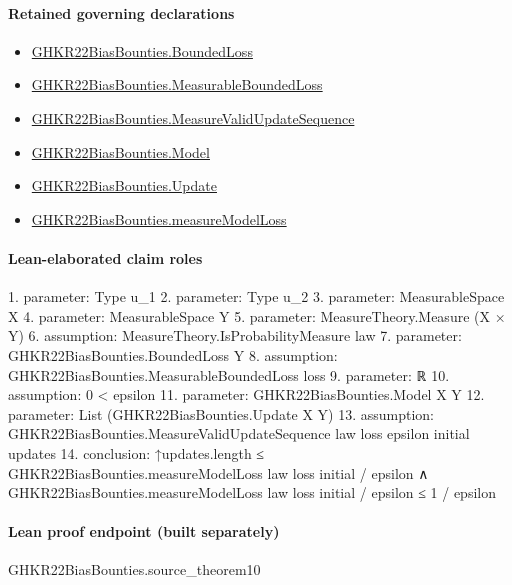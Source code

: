 \documentclass[10pt]{article}
\begin{document}
\paragraph{Retained governing declarations}
\begin{itemize}\raggedright
\item \hyperlink{paper-prerequisite-ef6c319b0770dad4}{GHKR22\allowbreak{}Bias\allowbreak{}Bounties.\allowbreak{}Bounded\allowbreak{}Loss}
\item \hyperlink{governing-declaration-56b96e1cde76e3f7}{GHKR22\allowbreak{}Bias\allowbreak{}Bounties.\allowbreak{}Measurable\allowbreak{}Bounded\allowbreak{}Loss}
\item \hyperlink{governing-declaration-894a171ecf6ab5b2}{GHKR22\allowbreak{}Bias\allowbreak{}Bounties.\allowbreak{}Measure\allowbreak{}Valid\allowbreak{}Update\allowbreak{}Sequence}
\item \hyperlink{paper-prerequisite-333127605c12eba8}{GHKR22\allowbreak{}Bias\allowbreak{}Bounties.\allowbreak{}Model}
\item \hyperlink{governing-declaration-0e4e1b8e058cab9d}{GHKR22\allowbreak{}Bias\allowbreak{}Bounties.\allowbreak{}Update}
\item \hyperlink{paper-prerequisite-dff6b99e26543d78}{GHKR22\allowbreak{}Bias\allowbreak{}Bounties.\allowbreak{}measure\allowbreak{}Model\allowbreak{}Loss}
\end{itemize}
\paragraph{Lean-elaborated claim roles}\begin{ReviewVerbatim}
1. parameter: Type u_1
2. parameter: Type u_2
3. parameter: MeasurableSpace X
4. parameter: MeasurableSpace Y
5. parameter: MeasureTheory.Measure (X × Y)
6. assumption: MeasureTheory.IsProbabilityMeasure law
7. parameter: GHKR22BiasBounties.BoundedLoss Y
8. assumption: GHKR22BiasBounties.MeasurableBoundedLoss loss
9. parameter: ℝ
10. assumption: 0 < epsilon
11. parameter: GHKR22BiasBounties.Model X Y
12. parameter: List (GHKR22BiasBounties.Update X Y)
13. assumption: GHKR22BiasBounties.MeasureValidUpdateSequence law loss epsilon initial updates
14. conclusion: ↑updates.length ≤ GHKR22BiasBounties.measureModelLoss law loss initial / epsilon ∧
  GHKR22BiasBounties.measureModelLoss law loss initial / epsilon ≤ 1 / epsilon
\end{ReviewVerbatim}

\paragraph{Lean proof endpoint (built separately)}\begin{ReviewVerbatim}
GHKR22BiasBounties.source_theorem10
\end{ReviewVerbatim}
\end{document}
